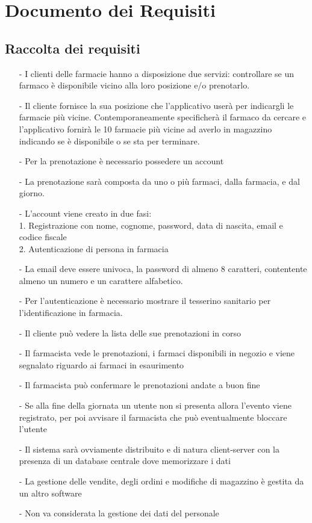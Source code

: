\newpage
\section{Documento dei Requisiti}

\subsection{Raccolta dei requisiti}

\begin{itemize}
  \item[-] I clienti delle farmacie hanno a disposizione due servizi: controllare se un farmaco è disponibile vicino alla loro posizione e/o prenotarlo.
  \item[-] Il cliente fornisce la sua posizione che l'applicativo userà per indicargli le farmacie più vicine. Contemporaneamente specificherà il farmaco da cercare e l'applicativo fornirà le 10 farmacie più vicine ad averlo in magazzino indicando se è disponibile o se sta per terminare.
  \item[-] Per la prenotazione è necessario possedere un account
  \item[-] La prenotazione sarà composta da uno o più farmaci, dalla farmacia, e dal giorno. 
  \item[-] L'account viene creato in due fasi:\\
      1. Registrazione con nome, cognome, password, data di nascita, email e codice fiscale\\
      2. Autenticazione di persona in farmacia
  \item[-] La email deve essere univoca, la password di almeno 8 caratteri, contentente almeno un numero e un carattere alfabetico.
  \item[-] Per l'autenticazione è necessario mostrare il tesserino sanitario per l'identificazione in farmacia.
  \item[-] Il cliente può vedere la lista delle sue prenotazioni in corso
  \item[-] Il farmacista vede le prenotazioni, i farmaci disponibili in negozio e viene segnalato riguardo ai farmaci in esaurimento
  \item[-] Il farmacista può confermare le prenotazioni andate a buon fine
  \item[-] Se alla fine della giornata un utente non si presenta allora l'evento viene registrato, per poi avvisare il farmacista che può eventualmente bloccare l'utente
  \item[-] Il sistema sarà ovviamente distribuito e di natura client-server con la presenza di un database centrale dove memorizzare i dati
  \item[-] La gestione delle vendite, degli ordini e modifiche di magazzino è gestita da un altro software
  \item[-] Non va considerata la gestione dei dati del personale 
\end{itemize}


